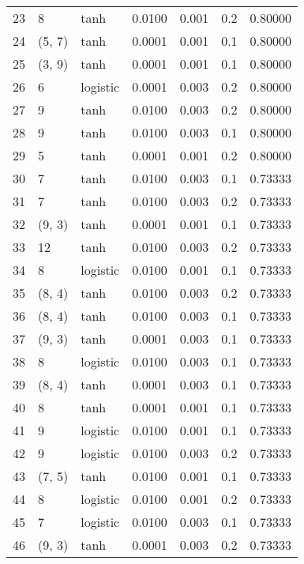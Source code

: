 \begin{tabular}{lllrrrr}
23  &           8 &      tanh &  0.0100 &  0.001 &  0.2 &   0.80000 \\
24  &      (5, 7) &      tanh &  0.0001 &  0.001 &  0.1 &   0.80000 \\
25  &      (3, 9) &      tanh &  0.0001 &  0.001 &  0.1 &   0.80000 \\
26  &           6 &  logistic &  0.0001 &  0.003 &  0.2 &   0.80000 \\
27  &           9 &      tanh &  0.0100 &  0.003 &  0.2 &   0.80000 \\
28  &           9 &      tanh &  0.0100 &  0.003 &  0.1 &   0.80000 \\
29  &           5 &      tanh &  0.0001 &  0.001 &  0.2 &   0.80000 \\
30  &           7 &      tanh &  0.0100 &  0.003 &  0.1 &   0.73333 \\
31  &           7 &      tanh &  0.0100 &  0.003 &  0.2 &   0.73333 \\
32  &      (9, 3) &      tanh &  0.0001 &  0.001 &  0.1 &   0.73333 \\
33  &          12 &      tanh &  0.0100 &  0.003 &  0.2 &   0.73333 \\
34  &           8 &  logistic &  0.0100 &  0.001 &  0.1 &   0.73333 \\
35  &      (8, 4) &      tanh &  0.0100 &  0.003 &  0.2 &   0.73333 \\
36  &      (8, 4) &      tanh &  0.0100 &  0.003 &  0.1 &   0.73333 \\
37  &      (9, 3) &      tanh &  0.0001 &  0.003 &  0.1 &   0.73333 \\
38  &           8 &  logistic &  0.0100 &  0.003 &  0.1 &   0.73333 \\
39  &      (8, 4) &      tanh &  0.0001 &  0.003 &  0.1 &   0.73333 \\
40  &           8 &      tanh &  0.0001 &  0.001 &  0.1 &   0.73333 \\
41  &           9 &  logistic &  0.0100 &  0.001 &  0.1 &   0.73333 \\
42  &           9 &  logistic &  0.0100 &  0.003 &  0.2 &   0.73333 \\
43  &      (7, 5) &      tanh &  0.0100 &  0.001 &  0.1 &   0.73333 \\
44  &           8 &  logistic &  0.0100 &  0.001 &  0.2 &   0.73333 \\
45  &           7 &  logistic &  0.0100 &  0.003 &  0.1 &   0.73333 \\
46  &      (9, 3) &      tanh &  0.0001 &  0.003 &  0.2 &   0.73333 \\

\end{tabular}
